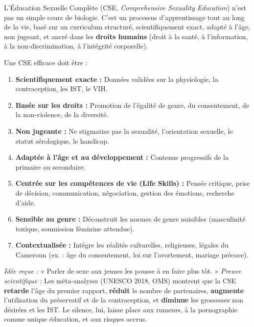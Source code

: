 \documentclass[11pt]{article}
\newcommand{\cle}[1]{{\popxbold\color{popdark}#1}}
\begin{document}
L'Éducation Sexuelle Complète (\cle{CSE}, \emph{Comprehensive Sexuality Education}) n'est pas un simple cours de biologie. C'est un processus d'apprentissage tout au long de la vie, basé sur un curriculum structuré, scientifiquement exact, adapté à l'âge, non jugeant, et ancré dans les \textbf{droits humains} (droit à la santé, à l'information, à la non-discrimination, à l'intégrité corporelle).

\begin{propriete}
Une CSE efficace doit être :
\begin{enumerate}
    \item \textbf{Scientifiquement exacte :} Données validées sur la physiologie, la contraception, les IST, le VIH.
    \item \textbf{Basée sur les droits :} Promotion de l'égalité de genre, du consentement, de la non-violence, de la diversité.
    \item \textbf{Non jugeante :} Ne stigmatise pas la sexualité, l'orientation sexuelle, le statut sérologique, le handicap.
    \item \textbf{Adaptée à l'âge et au développement :} Contenus progressifs de la primaire au secondaire.
    \item \textbf{Centrée sur les compétences de vie (Life Skills) :} Pensée critique, prise de décision, communication, négociation, gestion des émotions, recherche d'aide.
    \item \textbf{Sensible au genre :} Déconstruit les normes de genre nuisibles (masculinité toxique, soumission féminine attendue).
    \item \textbf{Contextualisée :} Intègre les réalités culturelles, religieuses, légales du Cameroun (ex. : âge du consentement, loi sur l'avortement, mariage précoce).
\end{enumerate}
\end{propriete}

\begin{attention}
\emph{Idée reçue :} « Parler de sexe aux jeunes les pousse à en faire plus tôt. »
\emph{Preuve scientifique :} Les méta-analyses (UNESCO 2018, OMS) montrent que la CSE \textbf{retarde} l'âge du premier rapport, \textbf{réduit} le nombre de partenaires, \textbf{augmente} l'utilisation du préservatif et de la contraception, et \textbf{diminue} les grossesses non désirées et les IST. Le silence, lui, laisse place aux rumeurs, à la pornographie comme unique éducation, et aux risques accrus.
\end{attention}
\end{document}
